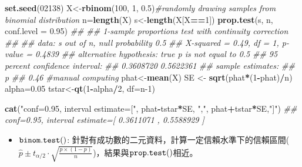 \documentclass[hyperref,]{ctexart}
\newenvironment{Shaded}{\begin{snugshade}}{\end{snugshade}}
\newcommand{\CommentTok}[1]{\textcolor[rgb]{0.56,0.35,0.01}{\textit{#1}}}
\newcommand{\DataTypeTok}[1]{\textcolor[rgb]{0.13,0.29,0.53}{#1}}
\newcommand{\DecValTok}[1]{\textcolor[rgb]{0.00,0.00,0.81}{#1}}
\newcommand{\FloatTok}[1]{\textcolor[rgb]{0.00,0.00,0.81}{#1}}
\newcommand{\KeywordTok}[1]{\textcolor[rgb]{0.13,0.29,0.53}{\textbf{#1}}}
\newcommand{\NormalTok}[1]{#1}
\newcommand{\OperatorTok}[1]{\textcolor[rgb]{0.81,0.36,0.00}{\textbf{#1}}}
\newcommand{\StringTok}[1]{\textcolor[rgb]{0.31,0.60,0.02}{#1}}
\providecommand{\tightlist}{%
  \setlength{\itemsep}{0pt}\setlength{\parskip}{0pt}}
\begin{document}
\begin{Shaded}
\begin{Highlighting}[]
\KeywordTok{set.seed}\NormalTok{(}\DecValTok{02138}\NormalTok{)}
\NormalTok{X<-}\KeywordTok{rbinom}\NormalTok{(}\DecValTok{100}\NormalTok{, }\DecValTok{1}\NormalTok{, }\FloatTok{0.5}\NormalTok{)}\CommentTok{#randomly drawing samples from binomial distribution}
\NormalTok{n=}\KeywordTok{length}\NormalTok{(X)}
\NormalTok{s<-}\KeywordTok{length}\NormalTok{(X[X}\OperatorTok{==}\DecValTok{1}\NormalTok{])}
\KeywordTok{prop.test}\NormalTok{(s, n, }\DataTypeTok{conf.level =} \FloatTok{0.95}\NormalTok{)}
\CommentTok{## }
\CommentTok{##  1-sample proportions test with continuity correction}
\CommentTok{## }
\CommentTok{## data:  s out of n, null probability 0.5}
\CommentTok{## X-squared = 0.49, df = 1, p-value = 0.4839}
\CommentTok{## alternative hypothesis: true p is not equal to 0.5}
\CommentTok{## 95 percent confidence interval:}
\CommentTok{##  0.3608720 0.5622361}
\CommentTok{## sample estimates:}
\CommentTok{##    p }
\CommentTok{## 0.46}
\CommentTok{#manual computing}
\NormalTok{phat<-}\KeywordTok{mean}\NormalTok{(X)}
\NormalTok{SE <-}\StringTok{ }\KeywordTok{sqrt}\NormalTok{(phat}\OperatorTok{*}\NormalTok{(}\DecValTok{1}\OperatorTok{-}\NormalTok{phat)}\OperatorTok{/}\NormalTok{n)}
\NormalTok{alpha=}\FloatTok{0.05}
\NormalTok{tstar<-}\KeywordTok{qt}\NormalTok{(}\DecValTok{1}\OperatorTok{-}\NormalTok{alpha}\OperatorTok{/}\DecValTok{2}\NormalTok{, }\DataTypeTok{df=}\NormalTok{n}\DecValTok{-1}\NormalTok{)}

\KeywordTok{cat}\NormalTok{(}\StringTok{"conf=0.95, interval estimate=["}\NormalTok{, phat}\OperatorTok{-}\NormalTok{tstar}\OperatorTok{*}\NormalTok{SE, }\StringTok{","}\NormalTok{, }
\NormalTok{         phat}\OperatorTok{+}\NormalTok{tstar}\OperatorTok{*}\NormalTok{SE,}\StringTok{"]"}\NormalTok{)}
\CommentTok{## conf=0.95, interval estimate=[ 0.3611071 , 0.5588929 ]}
\end{Highlighting}
\end{Shaded}

\begin{itemize}
\tightlist
\item
  \(\tt{binom.test()}\):
  針對有成功數的二元資料，計算一定信賴水準下的信賴區間(\(\hat{p}\pm t_{\alpha/2}\cdot \sqrt{\frac{p\times(1-p)}{n}}\))，結果與\(\tt{prop.test()}\)相近。
\end{itemize}
\end{document}
